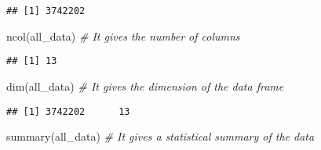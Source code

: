 \documentclass[
]{article}
\newenvironment{Shaded}{\begin{snugshade}}{\end{snugshade}}
\newcommand{\CommentTok}[1]{\textcolor[rgb]{0.56,0.35,0.01}{\textit{#1}}}
\newcommand{\FunctionTok}[1]{\textcolor[rgb]{0.00,0.00,0.00}{#1}}
\newcommand{\NormalTok}[1]{#1}
\begin{document}
\begin{verbatim}
## [1] 3742202
\end{verbatim}

\begin{Shaded}
\begin{Highlighting}[]
 \FunctionTok{ncol}\NormalTok{(all\_data) }\CommentTok{\# It gives the number of columns}
\end{Highlighting}
\end{Shaded}

\begin{verbatim}
## [1] 13
\end{verbatim}

\begin{Shaded}
\begin{Highlighting}[]
 \FunctionTok{dim}\NormalTok{(all\_data)  }\CommentTok{\# It gives the dimension of the data frame}
\end{Highlighting}
\end{Shaded}

\begin{verbatim}
## [1] 3742202      13
\end{verbatim}

\begin{Shaded}
\begin{Highlighting}[]
 \FunctionTok{summary}\NormalTok{(all\_data) }\CommentTok{\# It gives a statistical summary of the data}
\end{Highlighting}
\end{Shaded}
\end{document}
